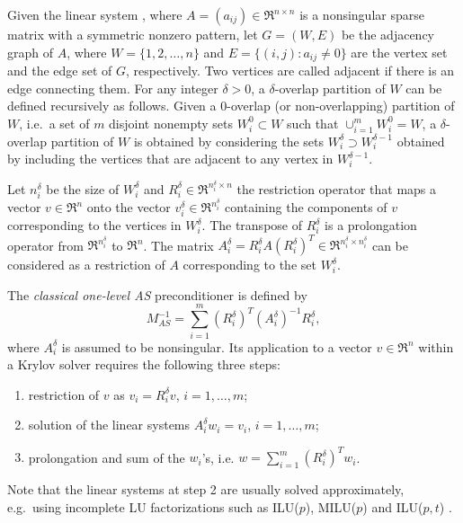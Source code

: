 Given the linear system ,
where $A=(a_{ij}) \in \Re^{n \times n}$ is a
nonsingular sparse matrix with a symmetric nonzero pattern,
let $G=(W,E)$ be the adjacency graph of $A$, where $W=\{1, 2, \ldots, n\}$
and $E=\{(i,j) : a_{ij} \neq 0\}$ are the vertex set and the edge set of $G$,
respectively. Two vertices are called adjacent if there is an edge connecting
them. For any integer $\delta > 0$, a $\delta$-overlap
partition of $W$ can be defined recursively as follows.
Given a 0-overlap (or non-overlapping) partition of $W$,
i.e.\ a set of $m$ disjoint nonempty sets $W_i^0 \subset W$ such that
$\cup_{i=1}^m W_i^0 = W$, a $\delta$-overlap
partition of $W$ is obtained by considering the sets
$W_i^\delta \supset W_i^{\delta-1}$ obtained by including the vertices that
are adjacent to any vertex in $W_i^{\delta-1}$.

Let $n_i^\delta$ be the size of $W_i^\delta$ and $R_i^{\delta} \in 
\Re^{n_i^\delta \times n}$ the restriction operator that maps
a vector $v \in \Re^n$ onto the vector $v_i^{\delta} \in \Re^{n_i^\delta}$
containing the components of $v$ corresponding to the vertices in
$W_i^\delta$. The transpose of $R_i^{\delta}$ is a
prolongation operator from $\Re^{n_i^\delta}$ to $\Re^n$.
The matrix $A_i^\delta=R_i^\delta A (R_i^\delta)^T \in
\Re^{n_i^\delta \times n_i^\delta}$ can be considered
as a restriction of $A$ corresponding to the set $W_i^{\delta}$.

The \emph{classical one-level AS} preconditioner is defined by
\[
M_{AS}^{-1}= \sum_{i=1}^m (R_i^{\delta})^T 
(A_i^\delta)^{-1} R_i^{\delta},
\]
where $A_i^\delta$ is assumed to be nonsingular. Its application
to a vector $v \in \Re^n$ within a Krylov solver requires the following
three steps:
\begin{enumerate}
	\item restriction of $v$ as $v_i = R_i^{\delta} v$, $i=1,\ldots,m$;
	\item solution of the linear systems $A_i^\delta w_i = v_i$,
	      $i=1,\ldots,m$;
	\item prolongation and sum of the $w_i$'s, i.e. $w = \sum_{i=1}^m (R_i^{\delta})^T w_i$.
\end{enumerate}
Note that the linear systems at step 2 are usually solved approximately,
e.g.\ using incomplete LU factorizations such as ILU($p$), MILU($p$) and
ILU($p,t$) \cite[Chapter 10]{Saad_book}.

